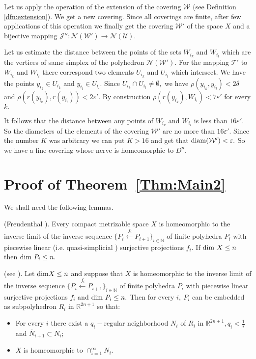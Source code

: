 Let us apply the operation of the extension of
the covering $\mathcal{W}$ (see Definition \ref{dfn:extension}).
We get a new covering. Since all coverings are finite, after few
applications of this operation we finally get the covering
$\mathcal{W'}$ of the space $X$ and a bijective mapping
$\mathcal{J}'': \mathcal{N}(\mathcal{W'}) \to
\mathcal{N}(\mathcal{U}).$

Let us estimate the distance between the points of the sets
$W_{i_k}$ and $W_{i_l}$ which are the vertices of same simplex of
the polyhedron $\mathcal{N}(\mathcal{W'}).$ For the mapping
$\mathcal{T}'$ to $W_{i_k}$ and $W_{i_l}$ there correspond two
elements $U_{i_k}$ and $U_{i_l}$ which intersect. We have the
points $y_{i_k}\in U_{i_k}$ and $y_{i_l}\in U_{i_l}.$ Since
$U_{i_k}\cap U_{i_l} \neq \emptyset,$ we have $\rho(y_{i_k},
y_{i_l})< 2\delta$ and $\rho(r(y_{i_k}), r(y_{i_l}))<
2\varepsilon'.$ By construction $\rho(r(y_{i_k}), W_{i_l}) <
7\varepsilon'$ for every $k.$ 

It follows that the distance between
any points of $W_{i_k}$ and $W_{i_l}$ is less than
$16\varepsilon'.$ So the diameters of the elements of the covering
$\mathcal{W'}$ are no more than $16\varepsilon'.$ Since the number
$K$ was arbitrary we can put $K > 16$ and
get that 
${\rm
diam}(\mathcal{W'})< \varepsilon.$ So we have a fine covering
whose nerve is homeomorphic to $D^n.$

\section{Proof of Theorem~\ref{Thm:Main2} }

We shall need the following lemmas.
\begin{lmm}\label{Freudenthal}{\rm (Freudenthal \cite{E, F, S}).}
Every compact metrizable space $X$ is homeomorphic to the inverse
limit of the inverse sequence $\{P_i \stackrel{\
f_i}\longleftarrow P_{i+1}\}_{i \in \mathbb{N}}$ of finite
polyhedra $P_i$ with piecewise linear {\rm (}i.e. quasi-simplicial
\cite[pp.148, 153]{E}{\rm )} surjective projections $f_i.$ If
${\rm dim}\ X \leq n$ then ${\rm dim}\ P_i \leq n.$
\end{lmm}

\begin{lmm}\label{Pseudo-polyhedral}{\rm (see \cite[Theorem 3.3]{GS}).}
Let ${\rm dim} X \leq n$ and suppose that $X$ is homeomorphic to
the inverse limit of the inverse sequence $\{P_i \stackrel{\
f_i}\longleftarrow P_{i+1}\}_{i \in \mathbb{N}}$ of finite
polyhedra $P_i$ with piecewise linear surjective projections $f_i$
and ${\rm dim}\ P_i \leq n.$ Then for every $i,\ P_i$ can be
embedded as subpolyhedron $R_i$ in $\mathbb{R}^{2n+1}$ so that:
\begin{itemize}
    \item For every $i$ there exist a $q_i-$regular neighborhood $N_i$ of $R_i$ in
$\mathbb{R}^{2n+1}, q_i < \frac{1}{i}$ and $\overline{N}_{i+1}
\subset N_{i};$
    \item $X$ is homeomorphic to $\cap_{i=1}^{\infty}N_{i}.$
\end{itemize}
\end{lmm}

